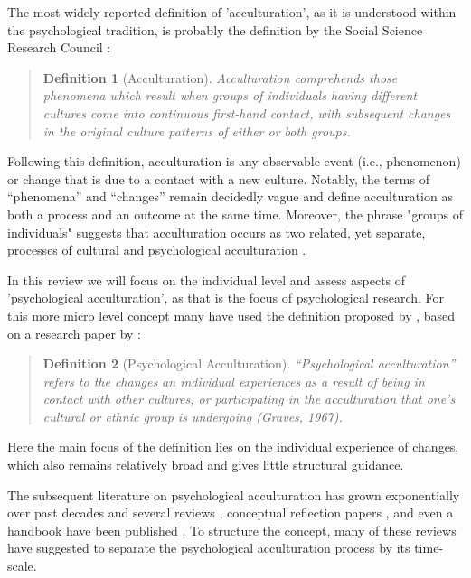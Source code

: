\documentclass[nobib]{tufte-handout}
\newtheorem{definition}{Definition}
\begin{document}
\label{sec:definition}The most widely reported definition of 'acculturation', as it is understood within the psychological tradition, is probably the definition by the Social Science Research Council \citep[][p. 149]{Redfield1936}:
\begin{quote}
    \begin{definition}[Acculturation]
        Acculturation comprehends those phenomena which result when groups of individuals having different cultures come into continuous first-hand contact, with subsequent changes in the original culture patterns of either or both groups.
    \end{definition}  
\end{quote}
Following this definition, acculturation is any observable event (i.e., phenomenon) or change that is due to a contact with a new culture. Notably, the terms of “phenomena” and “changes” remain decidedly vague and define acculturation as both a process and an outcome at the same time. Moreover, the phrase "groups of individuals" suggests that acculturation occurs as two related, yet separate, processes of cultural and psychological acculturation \citep[also see,][]{Sam2006b, Berry2005}.

In this review we will focus on the individual level and assess aspects of 'psychological acculturation', as that is the focus of psychological research. For this more micro level concept many have used the definition proposed by \citet[][p. 14]{Sam2006b}, based on a research paper by \citet{Graves1967}: 
\begin{quote}
    \begin{definition}[Psychological Acculturation]
        “Psychological acculturation” refers to the changes an individual experiences as a result of being in contact with other cultures, or participating in the acculturation that one’s cultural or ethnic group is undergoing (Graves, 1967).
    \end{definition}
\end{quote}
Here the main focus of the definition lies on the individual experience of changes, which also remains relatively broad and gives little structural guidance.

The subsequent literature on psychological acculturation has grown exponentially over past decades \citet{Rudmin2003a} and several reviews \citep[e.g.,][]{DeLeersnyder2017, Matsudaira2006, Celenk2011}, conceptual reflection papers \citep[e.g.,][]{Ward2012, Berry1997b}, and even a handbook have been published \citep{Sam2006a}. To structure the concept, many of these reviews have suggested to separate the psychological acculturation process by its time-scale. 
\end{document}
